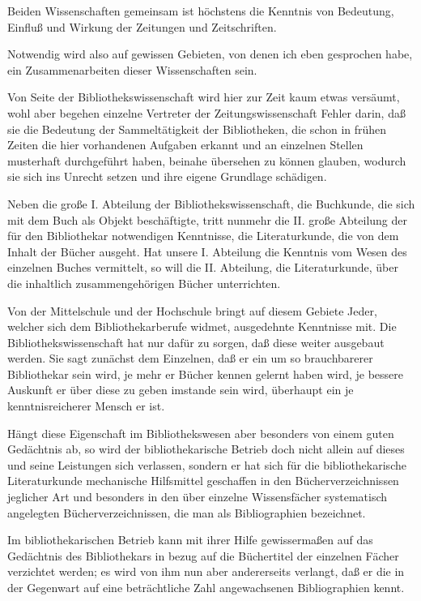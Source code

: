 \documentclass[a4paper,
fontsize=11pt,
oneside,
numbers=noperiodatend,
parskip=half-,
bibliography=totoc,
final
]{scrartcl}
\begin{document}
Beiden Wissenschaften gemeinsam ist höchstens die Kenntnis von
Bedeutung, Einfluß und Wirkung der Zeitungen und Zeitschriften.

Notwendig wird also auf gewissen Gebieten, von denen ich eben gesprochen
habe, ein Zusammenarbeiten dieser Wissenschaften sein.

Von Seite der Bibliothekswissenschaft wird hier zur Zeit kaum etwas
versäumt, wohl aber begehen einzelne Vertreter der Zeitungswissenschaft
Fehler darin, daß sie die Bedeutung der Sammeltätigkeit der
Bibliotheken, die schon in frühen Zeiten die hier vorhandenen Aufgaben
erkannt und an einzelnen Stellen musterhaft durchgeführt haben, beinahe
übersehen zu können glauben, wodurch sie sich ins Unrecht setzen und
ihre eigene Grundlage schädigen.

Neben die große I. Abteilung der Bibliothekswissenschaft, die Buchkunde,
die sich mit dem Buch als Objekt beschäftigte, tritt nunmehr die II.
große Abteilung der für den Bibliothekar notwendigen Kenntnisse, die
Literaturkunde, die von dem Inhalt der Bücher ausgeht. Hat unsere I.
Abteilung die Kenntnis vom Wesen des einzelnen Buches vermittelt, so
will die II. Abteilung, die Literaturkunde, über die inhaltlich
zusammengehörigen Bücher unterrichten.

Von der Mittelschule und der Hochschule bringt auf diesem Gebiete Jeder,
welcher sich dem Bibliothekarberufe widmet, ausgedehnte Kenntnisse mit.
Die Bibliothekswissenschaft hat nur dafür zu sorgen, daß diese weiter
ausgebaut werden. Sie sagt zunächst dem Einzelnen, daß er ein um so
brauchbarerer Bibliothekar sein wird, je mehr er Bücher kennen gelernt
haben wird, je bessere Auskunft er über diese zu geben imstande sein
wird, überhaupt ein je kenntnisreicherer Mensch er ist.

Hängt diese Eigenschaft im Bibliothekswesen aber besonders von einem
guten Gedächtnis ab, so wird der bibliothekarische Betrieb doch nicht
allein auf dieses und seine Leistungen sich verlassen, sondern er hat
sich für die bibliothekarische Literaturkunde mechanische Hilfsmittel
geschaffen in den Bücherverzeichnissen jeglicher Art und besonders in
den über einzelne Wissensfächer systematisch angelegten
Bücherverzeichnissen, die man als Bibliographien bezeichnet.

Im bibliothekarischen Betrieb kann mit ihrer Hilfe gewissermaßen auf das
Gedächtnis des Bibliothekars in bezug auf die Büchertitel der einzelnen
Fächer verzichtet werden; es wird von ihm nun aber andererseits
verlangt, daß er die in der Gegenwart auf eine beträchtliche Zahl
angewachsenen Bibliographien kennt.
\end{document}
